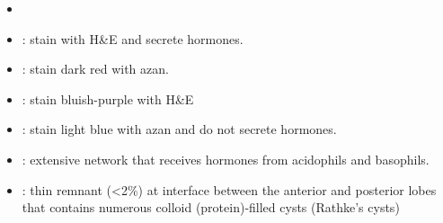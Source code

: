 \begin{multicols}{2}
\begin{itemize}
  \item {}
  
  \begin{center}
  \end{center}
  
  \item {}: stain with H\&E and secrete hormones. 
  
  \begin{center}
  \end{center}
  
  \vspace{50pt}

  \item {}: stain dark red with azan.
  
  \begin{center}
  \end{center}
  
  \item {}: stain bluish-purple with H\&E
  
  \begin{center}
  \end{center}
  
  \item {}: stain light blue with azan and do not secrete hormones.
  
  \begin{center}
  \end{center}
  
  \item {}: extensive network that receives hormones from acidophils and basophils.
  
  \begin{center}
  \end{center}
  
  \item {}:  thin remnant (<2\%) at interface between the anterior and posterior lobes that contains numerous colloid (protein)-filled cysts (Rathke's cysts)
  

\end{itemize}
\end{multicols}
